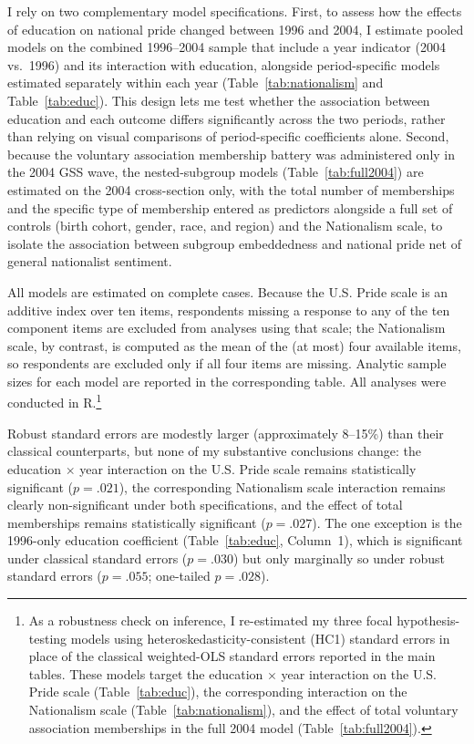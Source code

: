 \documentclass[12pt,letterpaper]{article}
\begin{document}
I rely on two complementary model specifications. First, to assess how the effects of education on national pride changed between 1996 and 2004, I estimate pooled models on the combined 1996--2004 sample that include a year indicator (2004 vs.\ 1996) and its interaction with education, alongside period-specific models estimated separately within each year (Table~\ref{tab:nationalism} and Table~\ref{tab:educ}). This design lets me test whether the association between education and each outcome differs significantly across the two periods, rather than relying on visual comparisons of period-specific coefficients alone. Second, because the voluntary association membership battery was administered only in the 2004 GSS wave, the nested-subgroup models (Table~\ref{tab:full2004}) are estimated on the 2004 cross-section only, with the total number of memberships and the specific type of membership entered as predictors alongside a full set of controls (birth cohort, gender, race, and region) and the Nationalism scale, to isolate the association between subgroup embeddedness and national pride net of general nationalist sentiment.

All models are estimated on complete cases. Because the U.S. Pride scale is an additive index over ten items, respondents missing a response to any of the ten component items are excluded from analyses using that scale; the Nationalism scale, by contrast, is computed as the mean of the (at most) four available items, so respondents are excluded only if all four items are missing. Analytic sample sizes for each model are reported in the corresponding table. All analyses were conducted in R.\footnote{As a robustness check on inference, I re-estimated my three focal hypothesis-testing models using heteroskedasticity-consistent (HC1) standard errors in place of the classical weighted-OLS standard errors reported in the main tables. These models target the education $\times$ year interaction on the U.S. Pride scale (Table~\ref{tab:educ}), the corresponding interaction on the Nationalism scale (Table~\ref{tab:nationalism}), and the effect of total voluntary association memberships in the full 2004 model (Table~\ref{tab:full2004}).}

Robust standard errors are modestly larger (approximately 8--15\%) than their classical counterparts, but none of my substantive conclusions change: the education $\times$ year interaction on the U.S. Pride scale remains statistically significant ($p = .021$), the corresponding Nationalism scale interaction remains clearly non-significant under both specifications, and the effect of total memberships remains statistically significant ($p = .027$). The one exception is the 1996-only education coefficient (Table~\ref{tab:educ}, Column~1), which is significant under classical standard errors ($p = .030$) but only marginally so under robust standard errors ($p = .055$; one-tailed $p = .028$).
\end{document}
